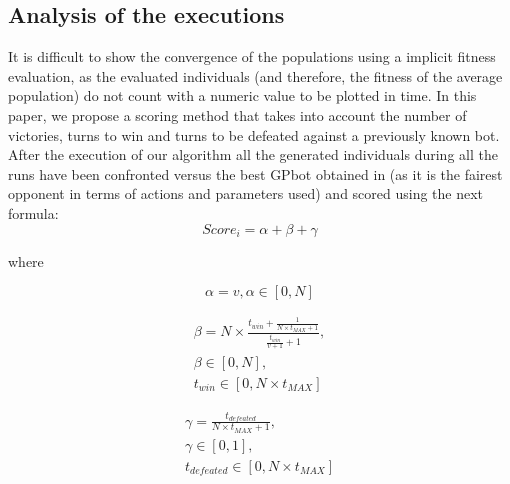 \documentclass[conference]{IEEEtran}
\begin{document}
\subsection{Analysis of the executions}   %
\label{subsec:analysisexecutions}

It is difficult to show the convergence of the populations using a implicit fitness evaluation, as the evaluated individuals (and therefore, the fitness of the average population) do not count with a numeric value to be plotted in time. In this paper, we propose a scoring method that takes into account the number of victories, turns to win and turns to be defeated %
 against a previously known bot. After the execution of our algorithm all the generated individuals during all the runs have been confronted versus the best GPbot obtained in \cite{GarciaGP14} (as it is the fairest opponent in terms of actions and parameters used) and scored using the next formula:
\begin{equation}
Score_{i}=\alpha+\beta+\gamma
\end{equation}

where

\begin{equation}
\alpha  = v, \alpha \in\left[0,N\right]
\end{equation}

\begin{equation}
\begin{split}
\beta =N\times\frac{t_{win}+\frac{1}{N\times t_{MAX}+1}}{\frac{t_{win}}{v+1}+1},\\
\beta \in\left[0,N\right], \\
t_{win} \in\left[0,N\times t_{MAX}\right]
\end{split}
\end{equation}

\begin{equation}
\begin{split}
\gamma  =\frac{t_{defeated}}{N \times t_{MAX}+1}, \\
\gamma \in\left[0,1\right], \\
t_{defeated} \in\left[0,N\times t_{MAX}\right]
\end{split}
\end{equation}
\end{document}
